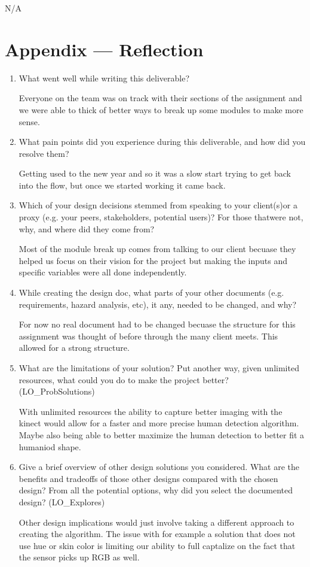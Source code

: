 \documentclass[12pt, titlepage]{article}
\begin{document}
N/A

\newpage{}

\section*{Appendix --- Reflection}

\begin{enumerate}
  \item What went well while writing this deliverable? 

  Everyone on the team was on track with their sections of the assignment and we were able to thick of better ways to break up some modules to make more sense.

\item What pain points did you experience during this deliverable, and how did you resolve them?

  Getting used to the new year and so it was a slow start trying to get back into the flow, but once we started working it came back.

\item Which of your design decisions stemmed from speaking to your client(s)or a proxy (e.g. your peers, stakeholders, potential users)? For those thatwere not, why, and where did they come from?

  Most of the module break up comes from talking to our client becuase they helped us focus on their vision for the project but making the inputs and specific variables were all done independently.

\item While creating the design doc, what parts of your other documents (e.g.
  requirements, hazard analysis, etc), it any, needed to be changed, and why?

  For now no real document had to be changed becuase the structure for this assignment was thought of before through the many client meets. This allowed for a strong structure.

\item What are the limitations of your solution?  Put another way, given
  unlimited resources, what could you do to make the project better? (LO\_ProbSolutions)

  With unlimited resources the ability to capture better imaging with the kinect would allow for a faster and more precise human detection algorithm. Maybe also being able to better maximize the human detection to better fit a humaniod shape.
\item Give a brief overview of other design solutions you considered.  What
  are the benefits and tradeoffs of those other designs compared with the chosen
  design?  From all the potential options, why did you select the documented design?
  (LO\_Explores)

  Other design implications would just involve taking a different approach to creating the algorithm. The issue with for example a solution that does not use hue or skin color is limiting our ability to full captalize on the fact that the sensor picks up RGB as well.

\end{enumerate}
\end{document}
